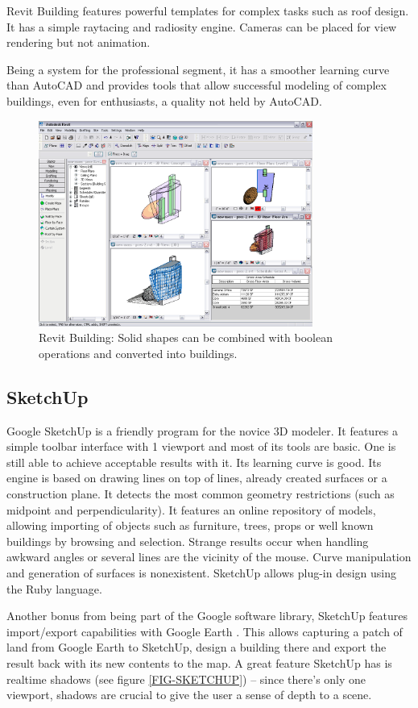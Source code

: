Revit Building features powerful templates for complex tasks such as roof design.
It has a simple raytacing and radiosity engine.
Cameras can be placed for view rendering but not animation.

Being a system for the professional segment, it has a smoother learning curve than
AutoCAD and provides tools that allow successful modeling of complex buildings,
even for enthusiasts, a quality not held by AutoCAD.

\begin{figure}[!ht]
    \centering
    \includegraphics[width=9cm]{gfx/revit-1.png}
    \caption{Revit Building: Solid shapes can be combined with boolean operations and converted into buildings.}
    \label{FIG-REVIT}
\end{figure}

\subsection{SketchUp}
Google SketchUp \cite{SITE-SKETCHUP} is a friendly program for the novice 3D modeler.
It features a simple toolbar interface with 1 viewport and most of its tools are basic.
One is still able to achieve acceptable results with it.
Its learning curve is good.
Its engine is based on drawing lines on top of lines,
already created surfaces or a construction plane.
It detects the most common geometry restrictions (such as midpoint and perpendicularity).
It features an online repository of models, allowing importing of objects such as
furniture, trees, props or well known buildings by browsing and selection.
Strange results occur when handling awkward angles
or several lines are the vicinity of the mouse.
Curve manipulation and generation of surfaces is nonexistent.
SketchUp allows plug-in design using the Ruby language.

Another bonus from being part of the Google software library, SketchUp features import/export capabilities with Google Earth \cite{SITE-EARTH}.
This allows capturing a patch of land from Google Earth to SketchUp, design a building there and export the result
back with its new contents to the map.
A great feature SketchUp has is realtime shadows (see figure \ref{FIG-SKETCHUP})
-- since there's only one viewport, shadows are crucial to give the user a sense of depth to a scene.

